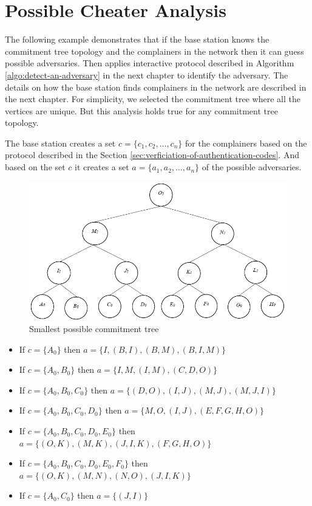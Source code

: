 \section{Possible Cheater Analysis}
	The following example demonstrates that if the base station knows the commitment tree topology and the complainers in the network then it can guess possible adversaries.
	Then applies interactive protocol described in Algorithm \ref{algo:detect-an-adversary} in the next chapter to identify the adversary.
	The details on how the base station finds complainers in the network are described in the next chapter.
	For simplicity, we selected the commitment tree where all the vertices are unique. But this analysis holds true for any commitment tree topology. 
	\begin{exmp}
	The base station creates a set $c=\{c_{1},c_{2} , \dotsc, c_{n}\}$ for the complainers based on the protocol described in the Section \ref{sec:verficiation-of-authentication-codes}.
	And based on the set $c$ it creates a set $a = \{a_{1},a_{2},\dotsc,a_{n}\}$ of the possible adversaries. 
		\begin{figure}[t]
			\centering
			\includegraphics[width=6in]{images/possible-cheaters.png}
			\caption{Smallest possible commitment tree}
			\label{fig:cheating}
		\end{figure}

		\begin{itemize}
			\item If $c=\{A_{0}\}$ then $a=\{I,(B,I),(B,M),(B,I,M)\}$
			\item If $c=\{A_{0},B_{0}\}$ then $a=\{I,M,(I,M),(C,D,O)\}$
			\item If $c=\{A_{0},B_{0},C_{0}\}$ then $a=\{(D,O),(I,J),(M,J),(M,J,I)\}$				
			\item If $c=\{A_{0},B_{0},C_{0},D_{0}\}$ then $a=\{M, O,(I,J),(E,F,G,H,O)\}$				
			\item If $c=\{A_{0},B_{0},C_{0},D_{0},E_{0}\}$ then $a=\{(O,K),(M,K),(J,I,K),(F,G,H,O)\}$				
			\item If $c=\{A_{0},B_{0},C_{0},D_{0},E_{0},F_{0}\}$ then $a=\{(O,K),(M,N),(N,O),(J,I,K)\}$
			\item If $c=\{A_{0},C_{0}\}$ then $a=\{(J,I)\}$
		\end{itemize}
	\end{exmp}

